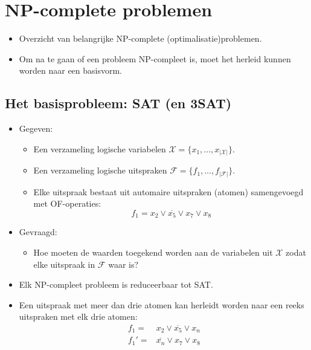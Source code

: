 \section{NP-complete problemen}

\begin{itemize}
    \item Overzicht van belangrijke NP-complete (optimalisatie)problemen.
    \item Om na te gaan of een probleem NP-compleet is, moet het herleid kunnen worden naar een basisvorm.
\end{itemize}

\subsection{Het basisprobleem: SAT (en 3SAT)}
\begin{itemize}
    \item Gegeven:
    \begin{itemize}
        \item Een verzameling logische variabelen $\mathcal{X} = \{x_1, \dots, x_{|\mathcal{X}|}\}$.
        \item Een verzameling logische uitspraken $\mathcal{F} = \{f_1, \dots, f_{|\mathcal{F}|}\}$.
        \item Elke uitspraak bestaat uit automaire uitspraken (atomen) samengevoegd met OF-operaties:
        $$f_1 = x_2 \vee \overline{x_5} \vee x_7 \vee x_8$$
    \end{itemize}
    \item Gevraagd:
    \begin{itemize}
        \item  Hoe moeten de waarden toegekend worden aan de variabelen uit $\mathcal{X}$ zodat elke uitspraak in $\mathcal{F}$ waar is?
    \end{itemize}
    \item Elk NP-compleet probleem is reduceerbaar tot SAT.
    \item Een uitspraak met meer dan drie atomen kan herleidt worden naar een reeks uitspraken met elk drie atomen:
    \begin{align*}
        f_1 = &x_2 \vee \overline{x_5} \vee x_n \\
        f_1' = &\overline{x_n} \vee x_7 \vee x_8
    \end{align*}
\end{itemize}

